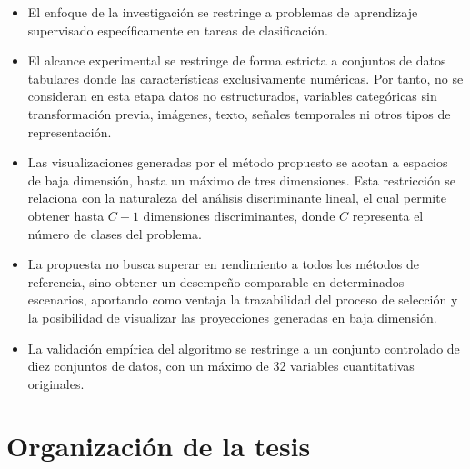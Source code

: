 \begin{itemize}
	 
	\item El enfoque de la investigación se restringe a problemas de aprendizaje supervisado específicamente en tareas de clasificación.
	
	\item El alcance experimental se restringe de forma estricta a conjuntos de datos tabulares donde las características exclusivamente numéricas. Por tanto, no se consideran en esta etapa datos no estructurados, variables categóricas sin transformación previa, imágenes, texto, señales temporales ni otros tipos de representación.
	
	\item Las visualizaciones generadas por el método propuesto se acotan a espacios de baja dimensión, hasta un máximo de tres dimensiones. Esta restricción se relaciona con la naturaleza del análisis discriminante lineal, el cual permite obtener hasta $C - 1$ dimensiones discriminantes, donde $C$ representa el número de clases del problema.
	
	\item La propuesta no busca superar en rendimiento a todos los métodos de referencia, sino obtener un desempeño comparable en determinados escenarios, aportando como ventaja la trazabilidad del proceso de selección y la posibilidad de visualizar las proyecciones generadas en baja dimensión.
	
	\item La validación empírica del algoritmo se restringe a un conjunto controlado de diez conjuntos de datos, con un máximo de 32 variables cuantitativas originales.
	
\end{itemize}

\section{Organización de la tesis}
\label{sec:Organización-Tesis}

